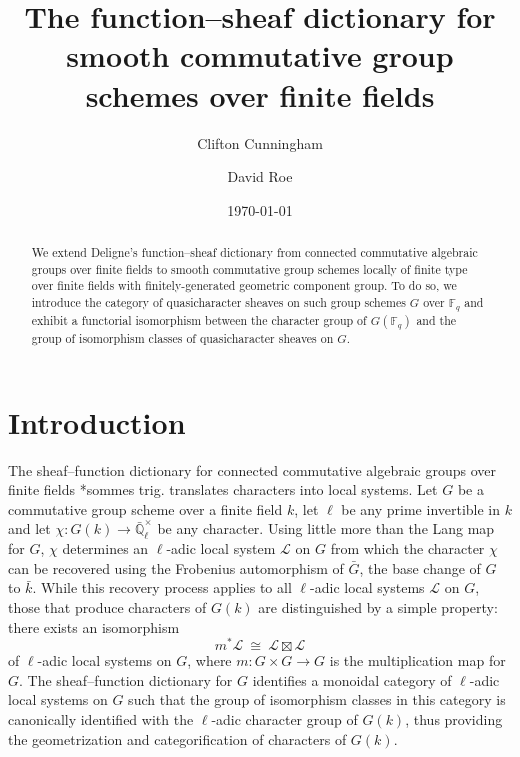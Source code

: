 \documentclass{amsart}
\title[The function--sheaf dictionary]{The function--sheaf dictionary for smooth commutative group schemes over finite fields}
\date{\today}
\author{Clifton Cunningham}
\author{David Roe}
\theoremstyle{plain}
\theoremstyle{definition}
\theoremstyle{remark}
\newcommand{\EE}{\mathbb{\bar Q}_\ell}
\newcommand{\bFq}{\bar{k}}
\newcommand{\Fq}{k}
\newcommand{\EEx}{\EE^\times}
\newcommand{\iso}{{\ \cong\ }}
\newcommand{\qcs}[1]{{\mathcal{#1}}}
\newcommand{\bG}{\bar{G}}
\begin{document}
\begin{abstract}
  We extend Deligne's function--sheaf dictionary from
  connected commutative algebraic groups over finite fields to smooth
  commutative group schemes locally of finite type over finite fields
  with finitely-generated geometric component group.
  To do so, we introduce the category of quasicharacter sheaves on such group schemes
  $G$ over $\mathbb{F}_q$ and exhibit a functorial isomorphism between the character group of $G(\mathbb{F}_q)$ and the group of isomorphism classes of quasicharacter sheaves on $G$.
   \end{abstract}

\maketitle

\section*{Introduction}

The sheaf--function dictionary for connected commutative algebraic groups over finite fields \cite{deligne:SGA4.5}*{sommes trig.} translates characters into local systems. Let $G$ be a commutative group scheme over a finite field $\Fq$, let $\ell$ be any prime invertible in $\Fq$ and let $\chi : G(\Fq) \to \EEx$ be any character. Using little more than the Lang map for $G$, $\chi$ determines an $\ell$-adic local system $\qcs{L}$ on $G$ from which the character $\chi$ can be recovered using the Frobenius automorphism of $\bG$, the base change of $G$ to $\bFq$. While this recovery process applies to all $\ell$-adic local systems $\qcs{L}$ on $G$, those that produce characters of $G(\Fq)$ are distinguished by a simple property: there exists an isomorphism 
\begin{equation}\label{introbox}
m^* \qcs{L} \iso \qcs{L} \boxtimes \qcs{L}
\end{equation}
 of $\ell$-adic local systems on $G$, where $m : G\times G \to G$ is the multiplication map for $G$. The sheaf--function dictionary for $G$ identifies a monoidal category of $\ell$-adic local systems on $G$ such that the group of isomorphism classes in this category is canonically identified with the $\ell$-adic character group of $G(\Fq)$, thus providing the geometrization and categorification of characters of $G(\Fq)$.
\end{document}
